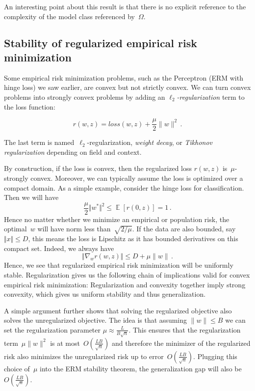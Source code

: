 \documentclass{tufte-book}
\begin{document}
An interesting point about this result is that there is no explicit
reference to the complexity of the model class referenced by~\(\Omega.\)

\hypertarget{stability-of-regularized-empirical-risk-minimization}{%
\subsection{Stability of regularized empirical risk
minimization}\label{stability-of-regularized-empirical-risk-minimization}}


Some empirical risk minimization problems, such as the Perceptron (ERM
with hinge loss) we saw earlier, are convex but not strictly convex. We
can turn convex problems into strongly convex problems by adding an
\emph{\(\ell_2\)-regularization} term to the loss function:

\[
r(w, z) = \mathit{loss}(w, z) + \frac{\mu}{2} \| w \|^2\,.
\]

The last term is named~\(\ell_2\)-regularization, \emph{weight decay},
or \emph{Tikhonov regularization} depending on field and
context.

By construction, if the loss is convex, then the regularized loss
\(r(w, z)\) is~\(\mu\)-strongly convex. Moreover, we can typically
assume the loss is optimized over a compact domain. As a simple example,
consider the hinge loss for classification. Then we will have \[
  \frac{\mu}{2} \Vert w^*\Vert^2 \leq \mathop\mathbb{E}[r(0,z)]  = 1\,.
\] Hence no matter whether we minimize an empirical or population risk,
the optimal~\(w\) will have norm less than~\(\sqrt{2/\mu}\). If the data
are also bounded, say~\(\Vert x \Vert \leq D\), this means the loss is
Lipschitz as it has bounded derivatives on this compact set. Indeed, we
always have \[
  \Vert \nabla_w r(w,z) \Vert \leq D+\mu \|w\|\,.
\] Hence, we see that regularized empirical risk minimization will be
uniformly stable. Regularization gives us the following chain of
implications valid for convex empirical risk minimization:
Regularization and convexity together imply strong convexity, which
gives us uniform stability and thus generalization.

A simple argument further shows that solving the regularized objective
also solves the unregularized objective. The idea is that assuming
\(\|w\|\le B\) we can set the regularization parameter
\(\mu \approx \frac{L}{B\sqrt{n}}\). This ensures that the
regularization term~\(\mu\|w\|^2\) is at most~\(O(\frac{LB}{\sqrt{n}})\)
and therefore the minimizer of the regularized risk also minimizes the
unregularized risk up to error~\(O(\frac{LB}{\sqrt{n}})\). Plugging this
choice of~\(\mu\) into the ERM stability theorem, the generalization gap
will also be \(O(\frac{LB}{\sqrt{n}})\).
\end{document}

